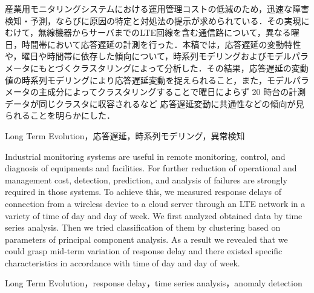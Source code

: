 \documentclass[technicalreport]{ieicej}
\begin{document}
\newcommand{\argmin}{\mathop{\rm arg~min}\limits}
\def \vector#1{\mbox{\boldmath $#1$}}

\begin{jabstract}
産業用モニタリングシステムにおける運用管理コストの低減のため，迅速な障害検知・予測，ならびに原因の特定と対処法の提示が求められている．その実現にむけて，無線機器からサーバまでのLTE回線を含む通信路について，異なる曜日，時間帯において応答遅延の計測を行った．本稿では，応答遅延の変動特性や，曜日や時間帯に依存した傾向について，時系列モデリングおよびモデルパラメータにもとづくクラスタリングによって分析した．その結果，応答遅延の変動値の時系列モデリングにより応答遅延変動を捉えられること，また，モデルパラメータの主成分によってクラスタリングすることで曜日によらず 20 時台の計測データが同じクラスタに収容されるなど
応答遅延変動に共通性などの傾向が見られることを明らかにした．
\end{jabstract}
\begin{jkeyword}
Long Term Evolution，応答遅延，時系列モデリング，異常検知
\end{jkeyword}
\begin{eabstract}
Industrial monitoring systems are useful in remote monitoring, control, and diagnosis of equipments and facilities.
 For further reduction of operational and management cost, detection, prediction, and analysis of failures are strongly required in those systems.
 To achieve this, we measured response delays of connection from a wireless device to a cloud server through an LTE network in a variety of time of day and day of week.
 We first analyzed obtained data by time series analysis.
 Then we tried classification of them by clustering based on parameters of principal component analysis.
 As a result we revealed that we could grasp mid-term variation of response delay and there existed specific characteristics in accordance with time of day and day of week.
\end{eabstract}
\begin{ekeyword}
Long Term Evolution，response delay，time series analysis，anomaly detection
\end{ekeyword}
\maketitle
\end{document}
